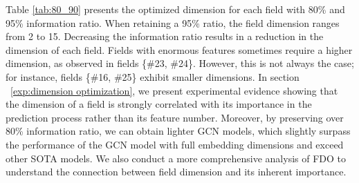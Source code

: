 \documentclass[sigconf]{acmart}
\begin{document}
Table \ref{tab:80_90} presents the optimized dimension for each field with 80\% and 95\% information ratio. When retaining a 95\% ratio, the field dimension ranges from 2 to 15. Decreasing the information ratio results in a reduction in the dimension of each field. Fields with enormous features sometimes require a higher dimension, as observed in fields \{\#23, \#24\}. However, this is not always the case; for instance, fields \{\#16, \#25\} exhibit smaller dimensions. In section ~\ref{exp:dimension optimization}, we present experimental evidence showing that the dimension of a field is strongly correlated with its importance in the prediction process rather than its feature number. Moreover, by preserving over 80\% information ratio, we can obtain lighter GCN models, which slightly surpass the performance of the GCN model with full embedding dimensions and exceed other SOTA models. We also conduct a more comprehensive analysis of FDO to understand the connection between field dimension and its inherent importance.
\end{document}
